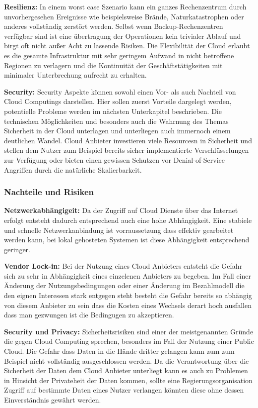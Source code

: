 \begin{spacing}{1.2}
\textbf{Resilienz:} In einem worst case Szenario kann ein ganzes Rechenzentrum
durch unvorhergesehen Ereignisse wie beispielsweise Brände, Naturkatastrophen
oder anderes vollständig zerstört werden. Selbst wenn Backup-Rechenzentren
verfügbar sind ist eine übertragung der Operationen kein trivialer Ablauf und
birgt oft nicht außer Acht zu lassende Risiken. Die Flexibilität der Cloud
erlaubt es die gesamte Infrastruktur mit sehr geringem Aufwand in nicht
betroffene Regionen zu verlagern und die Kontinuität der Geschäftstätigkeiten
mit minimaler Unterbrechung aufrecht zu erhalten.

\textbf{Security:} Security Aspekte können sowohl einen Vor- als auch Nachteil
von Cloud Computings darstellen. Hier sollen zuerst Vorteile dargelegt werden,
potentielle Probleme werden im nächsten Unterkapitel beschrieben.
Die technischen Möglichkeiten und besonders auch die Wahrnung des Themas
Sicherheit in der Cloud unterlagen und unterliegen auch immernoch einem
deutlichen Wandel. Cloud Anbieter investieren
viele Resourcesn in Sicherheit und stellen dem Nutzer zum Beispiel bereits sicher
implementierte Verschlüsselungen zur Verfügung oder bieten einen gewissen
Schutzen vor Denial-of-Service Angriffen durch die natürliche Skalierbarkeit.\\

\subsubsection{\textbf{Nachteile und Risiken}}

\textbf{Netzwerkabhängigeit:} Da der Zugriff auf Cloud Dienste über das
Internet erfolgt entsteht dadurch entsprechend auch eine hohe Abhängigkeit.
Eine stabiele und schnelle Netzwerkanbindung ist vorraussetzung dass effektiv
gearbeitet werden kann, bei lokal gehosteten Systemen ist diese Abhängigkeit
entsprechend geringer.

\textbf{Vendor Lock-in:} Bei der Nutzung eines Cloud Anbieters entsteht die
Gefahr sich zu sehr in Abhängigkeit eines einzelenen Anbieters zu begeben.
Im Fall einer Änderung der Nutzungsbedingungen oder einer Änderung im
Bezahlmodell die den eignen Interessen stark entgegen steht besteht die Gefahr
bereits so abhängig von diesem Anbieter zu sein dass die Kosten eines Wechsels
derart hoch ausfallen dass man gezwungen ist die Bedingugen zu akzeptieren.

\textbf{Security und Privacy:} Sicherheitsrisiken sind einer der meistgenannten
Gründe die gegen Cloud Computing sprechen, besonders im Fall der Nutzung einer
Public Cloud. Die Gefahr dass Daten in die Hände dritter gelangen kann zum
zum Beispiel nicht vollständig ausgeschlossen werden. Da die Verantwortung über
die Sicherheit der Daten dem Cloud Anbieter unterliegt kann es auch zu Problemen
in Hinsicht der Privateheit der Daten kommen, sollte eine Regierungsorganisation
Zugriff auf bestimmte Daten eines Nutzer verlangen könnten diese ohne dessen
Einverständnis gewährt werden.


\end{spacing}
